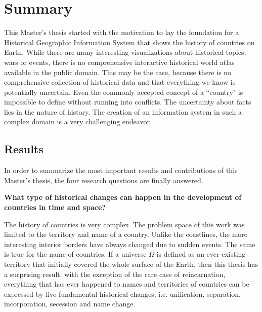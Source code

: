 
\chapter{Summary} %
\label{cha:summary}


This Master's thesis started with the motivation to lay the foundation for a Historical Geographic Information System that shows the history of countries on Earth. While there are many interesting visualizations about historical topics, wars or events, there is no comprehensive interactive historical world atlas available in the public domain. This may be the case, because there is no comprehensive collection of historical data and that everything we know is potentially uncertain.
Even the commonly accepted concept of a ``country" is impossible to define without running into conflicts.
The uncertainty about facts lies in the nature of history.
The creation of an information system in such a complex domain is a very challenging endeavor.

\section{Results} %
\label{sec:results}

In order to summarize the most important results and contributions of this Master's thesis, the four research questions are finally answered.

\begin{description}[labelindent=0.55em]
  \item[\textbf{1)}]
  \textbf{
    What type of historical changes can happen in the development of countries in time and space?
  }
\end{description}

The history of countries is very complex. The problem space of this work was limited to the territory and name of a country. Unlike the coastlines, the more interesting interior borders have always changed due to sudden events. The same is true for the name of countries. If a universe $\Omega$ is defined as an ever-existing territory that initially covered the whole surface of the Earth, then this thesis has a surprising result: with the exception of the rare case of reincarnation, everything that has ever happened to names and territories of countries can be expressed by five fundamental historical changes, i.e. unification, separation, incorporation, secession and name change.

